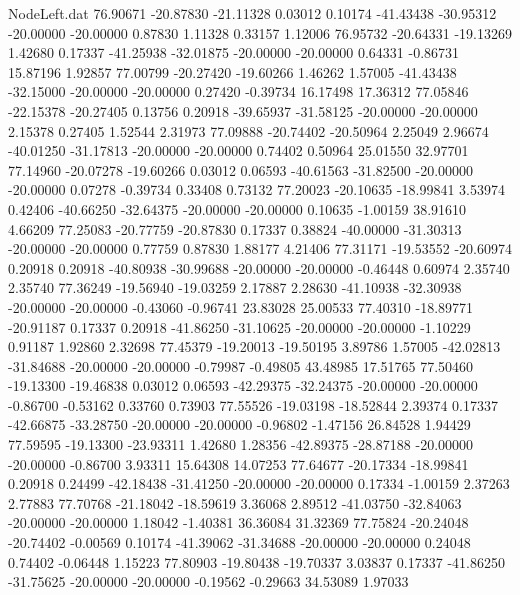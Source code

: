 \begin{filecontents}{NodeLeft.dat}
  76.90671  -20.87830  -21.11328     0.03012    0.10174  -41.43438  -30.95312  -20.00000  -20.00000    0.87830    1.11328    0.33157    1.12006
  76.95732  -20.64331  -19.13269     1.42680    0.17337  -41.25938  -32.01875  -20.00000  -20.00000    0.64331   -0.86731   15.87196    1.92857
  77.00799  -20.27420  -19.60266     1.46262    1.57005  -41.43438  -32.15000  -20.00000  -20.00000    0.27420   -0.39734   16.17498   17.36312
  77.05846  -22.15378  -20.27405     0.13756    0.20918  -39.65937  -31.58125  -20.00000  -20.00000    2.15378    0.27405    1.52544    2.31973
  77.09888  -20.74402  -20.50964     2.25049    2.96674  -40.01250  -31.17813  -20.00000  -20.00000    0.74402    0.50964   25.01550   32.97701
  77.14960  -20.07278  -19.60266     0.03012    0.06593  -40.61563  -31.82500  -20.00000  -20.00000    0.07278   -0.39734    0.33408    0.73132
  77.20023  -20.10635  -18.99841     3.53974    0.42406  -40.66250  -32.64375  -20.00000  -20.00000    0.10635   -1.00159   38.91610    4.66209
  77.25083  -20.77759  -20.87830     0.17337    0.38824  -40.00000  -31.30313  -20.00000  -20.00000    0.77759    0.87830    1.88177    4.21406
  77.31171  -19.53552  -20.60974     0.20918    0.20918  -40.80938  -30.99688  -20.00000  -20.00000   -0.46448    0.60974    2.35740    2.35740
  77.36249  -19.56940  -19.03259     2.17887    2.28630  -41.10938  -32.30938  -20.00000  -20.00000   -0.43060   -0.96741   23.83028   25.00533
  77.40310  -18.89771  -20.91187     0.17337    0.20918  -41.86250  -31.10625  -20.00000  -20.00000   -1.10229    0.91187    1.92860    2.32698
  77.45379  -19.20013  -19.50195     3.89786    1.57005  -42.02813  -31.84688  -20.00000  -20.00000   -0.79987   -0.49805   43.48985   17.51765
  77.50460  -19.13300  -19.46838     0.03012    0.06593  -42.29375  -32.24375  -20.00000  -20.00000   -0.86700   -0.53162    0.33760    0.73903
  77.55526  -19.03198  -18.52844     2.39374    0.17337  -42.66875  -33.28750  -20.00000  -20.00000   -0.96802   -1.47156   26.84528    1.94429
  77.59595  -19.13300  -23.93311     1.42680    1.28356  -42.89375  -28.87188  -20.00000  -20.00000   -0.86700    3.93311   15.64308   14.07253
  77.64677  -20.17334  -18.99841     0.20918    0.24499  -42.18438  -31.41250  -20.00000  -20.00000    0.17334   -1.00159    2.37263    2.77883
  77.70768  -21.18042  -18.59619     3.36068    2.89512  -41.03750  -32.84063  -20.00000  -20.00000    1.18042   -1.40381   36.36084   31.32369
  77.75824  -20.24048  -20.74402    -0.00569    0.10174  -41.39062  -31.34688  -20.00000  -20.00000    0.24048    0.74402   -0.06448    1.15223
  77.80903  -19.80438  -19.70337     3.03837    0.17337  -41.86250  -31.75625  -20.00000  -20.00000   -0.19562   -0.29663   34.53089    1.97033

\end{filecontents}

